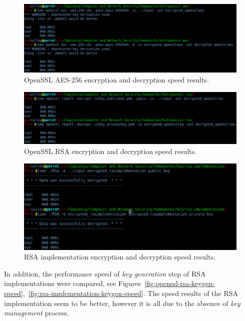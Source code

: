 \documentclass[11 pt]{article}
\begin{document}
\begin{figure}[H]
    \centering
    \includegraphics[width=1\linewidth]{openssl_aes_speed_results.png}
    \caption{OpenSSL AES-256 encryption and decryption speed results.}
    \label{fig:openssl-aes-speed}
\end{figure}

\begin{figure}[H]
    \centering
    \includegraphics[width=1\linewidth]{openssl_rsa_speed_results.png}
    \caption{OpenSSL RSA encryption and decryption speed results.}
    \label{fig:openssl-rsa-speed}
\end{figure}

\begin{figure}[H]
    \centering
    \includegraphics[width=1\linewidth]{rsa_implementation_speed_results.png}
    \caption{RSA implementation encryption and decryption speed results.}
    \label{fig:rsa-implementation-speed}
\end{figure}

\newline
In addition, the performance speed of \textit{key generation} step of RSA implementations were compared, see Figures~\ref{fig:openssl-rsa-keygen-speed},~\ref{fig:rsa-implementation-keygen-speed}. The speed results of the RSA implementation seem to be better, however it is all due to the absence of \textit{key management} process. 
\end{document}
